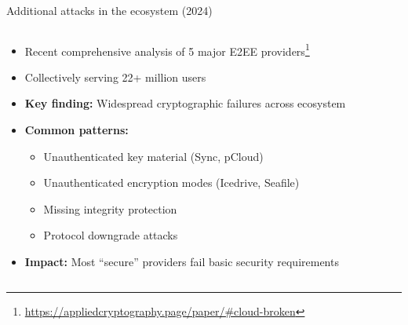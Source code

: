 \documentclass[aspectratio=169, lualatex, handout]{beamer}
\begin{document}
\begin{frame}{Additional attacks in the ecosystem (2024)}
	\begin{columns}[c]
		\begin{column}{1\textwidth}
			\begin{itemize}
				\item Recent comprehensive analysis of 5 major E2EE providers\footnote{\url{https://appliedcryptography.page/paper/\#cloud-broken}}
				\item Collectively serving 22+ million users
				\item \textbf{Key finding:} Widespread cryptographic failures across ecosystem
				\item \textbf{Common patterns:}
				      \begin{itemize}
					      \item Unauthenticated key material (Sync, pCloud)
					      \item Unauthenticated encryption modes (Icedrive, Seafile)
					      \item Missing integrity protection
					      \item Protocol downgrade attacks
				      \end{itemize}
				\item \textbf{Impact:} Most ``secure'' providers fail basic security requirements
			\end{itemize}
		\end{column}
	\end{columns}
\end{frame}
\end{document}
